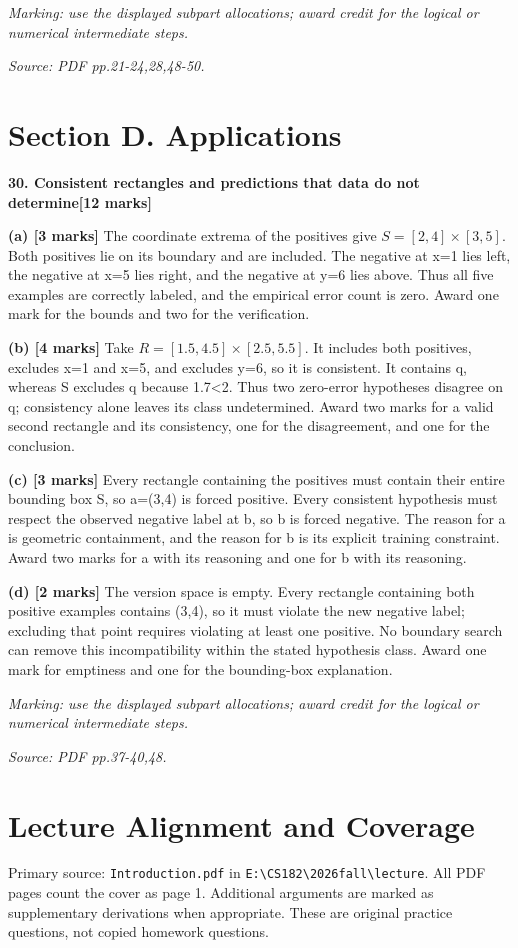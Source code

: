 \documentclass[11pt,a4paper]{article}
\begin{document}
\textit{Marking: use the displayed subpart allocations; award credit for the logical or numerical intermediate steps.}\par
{\footnotesize\textit{Source: PDF pp.21-24,28,48-50.}}
\newpage\section*{Section D. Applications}
\textbf{30. Consistent rectangles and predictions that data do not determine}\hfill\textbf{[12 marks]}\par\medskip
\textbf{(a) [3 marks]} The coordinate extrema of the positives give \(S=[2,4]\times[3,5]\). Both positives lie on its boundary and are included. The negative at x=1 lies left, the negative at x=5 lies right, and the negative at y=6 lies above. Thus all five examples are correctly labeled, and the empirical error count is zero. Award one mark for the bounds and two for the verification.

\textbf{(b) [4 marks]} Take \(R=[1.5,4.5]\times[2.5,5.5]\). It includes both positives, excludes x=1 and x=5, and excludes y=6, so it is consistent. It contains q, whereas S excludes q because 1.7<2. Thus two zero-error hypotheses disagree on q; consistency alone leaves its class undetermined. Award two marks for a valid second rectangle and its consistency, one for the disagreement, and one for the conclusion.

\textbf{(c) [3 marks]} Every rectangle containing the positives must contain their entire bounding box S, so a=(3,4) is forced positive. Every consistent hypothesis must respect the observed negative label at b, so b is forced negative. The reason for a is geometric containment, and the reason for b is its explicit training constraint. Award two marks for a with its reasoning and one for b with its reasoning.

\textbf{(d) [2 marks]} The version space is empty. Every rectangle containing both positive examples contains (3,4), so it must violate the new negative label; excluding that point requires violating at least one positive. No boundary search can remove this incompatibility within the stated hypothesis class. Award one mark for emptiness and one for the bounding-box explanation.

\textit{Marking: use the displayed subpart allocations; award credit for the logical or numerical intermediate steps.}\par
{\footnotesize\textit{Source: PDF pp.37-40,48.}}
\newpage\section*{Lecture Alignment and Coverage}
Primary source: \texttt{Introduction.pdf} in \texttt{E:\textbackslash CS182\textbackslash 2026fall\textbackslash lecture}. All PDF pages count the cover as page 1. Additional arguments are marked as supplementary derivations when appropriate. These are original practice questions, not copied homework questions.
\end{document}

